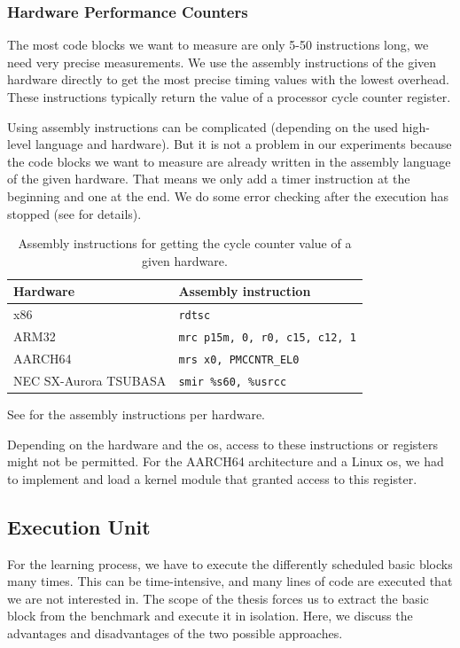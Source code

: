\subsubsection{Hardware Performance Counters}
\tobechecked
\label{sec:approach:hwpercounter}
The most code blocks we want to measure are only 5-50 instructions long, \ie we need very precise measurements.
We use the assembly instructions of the given hardware directly to get the most precise timing values with the lowest overhead.
These instructions typically return the value of a processor cycle counter register.

Using assembly instructions can be complicated (depending on the used high-level language and hardware).
But it is not a problem in our experiments because the code blocks we want to measure are already written in the assembly language of the given hardware.
That means we only add a timer instruction at the beginning and one at the end.
We do some error checking after the execution has stopped (see  for details).
\begin{table}
    \centering
    \begin{tabular}{@{}ll@{}}
        \toprule
        Hardware & Assembly instruction \\
        \midrule
        x86 & \lstinline|rdtsc| \\
        ARM32 & \lstinline|mrc p15m, 0, r0, c15, c12, 1| \\
        AARCH64 & \lstinline|mrs x0, PMCCNTR_EL0| \\
        NEC SX-Aurora TSUBASA & \lstinline|smir %s60, %usrcc| \\
        \bottomrule
    \end{tabular}
    \caption{Assembly instructions for getting the cycle counter value of a given hardware.}
    \label{tab:approach:asm_instrs_timing}
\end{table}
See  for the assembly instructions per hardware.

Depending on the hardware and the \ac{os}, access to these instructions or registers might not be permitted.
For the AARCH64 architecture and a Linux \ac{os}, we had to implement and load a kernel module that granted access to this register.
 

\subsection{Execution Unit}
\label{sec:approach:exec_unit}
For the learning process, we have to execute the differently scheduled basic blocks many times.
This can be time-intensive, and many lines of code are executed that we are not interested in.
The scope of the thesis forces us to extract the basic block from the benchmark and execute it in isolation.
Here, we discuss the advantages and disadvantages of the two possible approaches.

